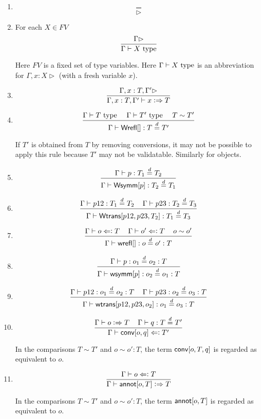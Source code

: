 \documentclass[11pt]{article}
\newcommand{\eqd}{\stackrel{d}{=}}
\newcommand{\spc}{{\,\,\,\,\,\,\,}}
\newcommand{\synth}{\vcentcolon\Rightarrow}
\newcommand{\force}{\Leftarrow\vcentcolon}
\newcommand{\Type}{\mathop{{\, \rm type}}}
\newcommand{\ha}[2]{#1[#2]}
\newcommand{\Wrefl}{{\sf Wrefl}}
\newcommand{\Wtrans}{{\sf Wtrans}}
\newcommand{\Wsymm}{{\sf Wsymm}}
\newcommand{\wrefl}{{\sf wrefl}}
\newcommand{\annot}{{\sf annot}}
\newcommand{\conv}{{\sf conv}}
\newcommand{\wsymm}{{\sf wsymm}}
\newcommand{\wtrans}{{\sf wtrans}}
\begin{document}
\begin{enumerate}

\item 
$$\frac{}{\rhd}$$

\item For each $X\in FV$
$$\frac{\Gamma\rhd}{\Gamma\vdash X \Type}$$

Here $FV$ is a fixed set of type variables.  Here $\Gamma\vdash X \Type$
is an abbreviation for $\Gamma, x:X\rhd$ (with a fresh variable $x$).

\item 
$$\frac{\Gamma, x:T, \Gamma'\rhd}{\Gamma, x:T, \Gamma'\vdash x \synth T}$$

\item 
$$\frac{\Gamma \vdash T \Type\spc \Gamma \vdash T'\Type \spc T\sim T'}{\Gamma\vdash \ha\Wrefl{}: T\eqd T'}$$

If $T'$ is obtained from $T$ by removing conversions, it may not be possible to apply
this rule because $T'$ may not be validatable.  Similarly for objects.

\item 
$$\frac{\Gamma\vdash p:T_1\eqd T_2}{\Gamma\vdash \ha\Wsymm{p}:T_2\eqd T_1}$$

\item 
$$\frac{\Gamma\vdash p12:T_1\eqd T_2\spc\Gamma\vdash p23:T_2\eqd T_3}{\Gamma\vdash \ha\Wtrans{p12,p23,T_2}: T_1\eqd T_3}$$

\item 
$$\frac{\Gamma\vdash o \force T\spc\Gamma\vdash o' \force T \spc o \sim o'}{\Gamma\vdash \ha\wrefl{}:o\eqd o':T}$$

\item 
$$\frac{\Gamma\vdash p:o_1\eqd o_2:T}{\Gamma\vdash \ha\wsymm{p}:o_2\eqd o_1:T}$$

\item 
$$\frac{\Gamma\vdash p12:o_1\eqd o_2:T\spc\Gamma\vdash p23:o_2\eqd o_3:T}{\Gamma\vdash \ha\wtrans{p12,p23,o_2}:o_1\eqd o_3:T}$$

\item 
$$\frac{\Gamma\vdash o \synth T\spc \Gamma\vdash q : T\eqd T'}{\Gamma\vdash \ha\conv{o,q} \force T'}$$

In the comparisons $T\sim T'$ and $o\sim o':T$, the term $\ha\conv{o,T,q}$ is regarded as equivalent to $o$.

\item 
$$\frac{\Gamma\vdash o \force T}{\Gamma\vdash \ha\annot{o,T} \synth T}$$

In the comparisons $T\sim T'$ and $o\sim o':T$, the term $\ha\annot{o,T}$ is regarded as equivalent to $o$.

\end{enumerate}
\end{document}
